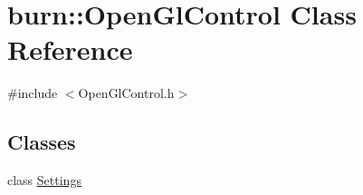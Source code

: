\hypertarget{classburn_1_1_open_gl_control}{\section{burn\-:\-:Open\-Gl\-Control Class Reference}
\label{classburn_1_1_open_gl_control}
}


{\ttfamily \#include $<$Open\-Gl\-Control.\-h$>$}

\subsection*{Classes}
\begin{DoxyCompactItemize}
\item 
class \hyperlink{classburn_1_1_open_gl_control_1_1_settings}{Settings}
\end{DoxyCompactItemize}
